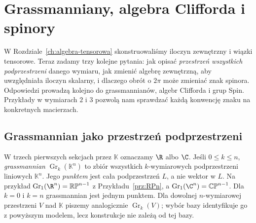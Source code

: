 \chapter{Grassmanniany, algebra Clifforda i spinory}
\label{ch:grass-spin}

W Rozdziale~\ref{ch:algebra-tensorowa} skonstruowaliśmy iloczyn
zewnętrzny i wiązki tensorowe. Teraz zadamy trzy kolejne pytania:
jak opisać \emph{przestrzeń wszystkich podprzestrzeni} danego wymiaru,
jak zmienić algebrę zewnętrzną, aby uwzględniała iloczyn skalarny,
i dlaczego obrót o $2\pi$ może zmieniać znak spinora.
Odpowiedzi prowadzą kolejno do grassmannianów, algebr Clifforda
i grup Spin. Przykłady w wymiarach $2$ i $3$ pozwolą nam
sprawdzać każdą konwencję znaku na konkretnych macierzach.

\section{Grassmannian jako przestrzeń podprzestrzeni}
\label{sec:grass-atlas}

W trzech pierwszych sekcjach przez $\mathbb K$ oznaczamy
$\R$ albo $\C$.
Jeśli $0\leq k\leq n$, \emph{grassmannian}
$\operatorname{Gr}_k(\mathbb K^n)$ to zbiór wszystkich
$k$-wymiarowych podprzestrzeni liniowych $\mathbb K^n$.
Jego \emph{punktem} jest cała podprzestrzeń $L$,
a nie wektor w $L$. Na przykład
$\operatorname{Gr}_1(\R^n)=\mathbb{RP}^{n-1}$
z Przykładu~\ref{prz:RPn}, a
$\operatorname{Gr}_1(\C^n)=\mathbb{CP}^{n-1}$.
Dla $k=0$ i $k=n$ grassmannian jest jednym punktem.
Dla dowolnej $n$-wymiarowej przestrzeni $V$ nad $\mathbb K$
piszemy analogicznie $\operatorname{Gr}_k(V)$; wybór bazy
identyfikuje go z powyższym modelem, lecz konstrukcje nie zależą od tej bazy.

